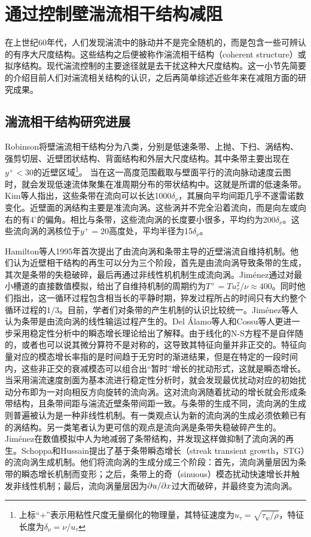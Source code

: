 \section{通过控制壁湍流相干结构减阻}
在上世纪60年代，人们发现湍流中的脉动并不是完全随机的，而是包含一些可辨认的有序大尺度结构。这些结构之后便被称作湍流相干结构（coherent structure）或拟序结构。现代湍流控制的主要途径就是去干扰这种大尺度结构。这一小节先简要的介绍目前人们对湍流相关结构的认识，之后再简单综述近些年来在减阻方面的研究成果。
\subsection{湍流相干结构研究进展}
Robinson\cite{Robinson1991}将壁湍流相干结构分为八类，分别是低速条带、上抛、下扫、涡结构、强剪切层、近壁团状结构、背面结构和外层大尺度结构。其中条带主要出现在$y^+<30$的近壁区域\footnote{上标“+”表示用粘性尺度无量纲化的物理量，其特征速度为$u_\tau=\sqrt{\tau_w/\rho}$，特征长度为$\delta_\nu=\nu/u_\tau$}。
当在这一高度范围截取与壁面平行的流向脉动速度云图时，就会发现低速流体聚集在准周期分布的带状结构中。这就是所谓的低速条带。Kim等人\cite{Kim1987}指出，这些条带在流向可以长达1000$\delta_\nu$，其展向平均间距几乎不遂雷诺数变化。近壁面的涡结构主要是准流向涡。这些涡并不完全沿着流向，而是向左或向右的有4$^\circ$的偏角\cite{Jeong1997}。相比与条带，这些流向涡的长度要小很多，平均约为200$\delta_\nu$。这些流向涡的涡核位于$y^+=20$高度处，平均半径为15$\delta_\nu$。

Hamilton等人\cite{Hamilton1995}1995年首次提出了由流向涡和条带主导的近壁湍流自维持机制。他们认为近壁相干结构的再生可以分为三个阶段，首先是由流向涡导致条带的生成，其次是条带的失稳破碎，最后再通过非线性机机制生成流向涡。Jim\'enez\cite{Jimenez2005}通过对最小槽道的直接数值模拟，给出了自维持机制的周期约为$T^+=Tu^2_\tau/\nu\approx400$。同时他们指出，这一循环过程包含相当长的平静时期，猝发过程所占的时间只有大约整个循环过程的1/3。目前，学者们对条带的产生机制的认识比较统一。Jim\'enez等人\cite{Jimenez1999}认为条带是由流向涡的线性输运过程产生的。Del \'Alamo等人\cite{del2006}和Cossu等人\cite{Cossu2009}更进一步采用稳定性分析中的瞬态增长理论给出了解释。由于线化的N-S方程不是自伴随的，或者也可以说其微分算符不是对称的，这导致其特征向量并非正交的。特征向量对应的模态增长率指的是时间趋于无穷时的渐进结果，但是在特定的一段时间内，这些非正交的衰减模态可以组合出“暂时”增长的扰动形式，这就是瞬态增长。当采用湍流速度剖面为基本流进行稳定性分析时，就会发现最优扰动对应的初始扰动分布即为一对向相反方向旋转的流向涡。这对流向涡随着扰动的增长就会形成条带结构，且条带间距与湍流近壁条带间距一致。与条带的生成不同，流向涡的生成则普遍被认为是一种非线性机制。有一类观点认为新的流向涡的生成必须依赖已有的涡结构\cite{Heist2000}。另一类笔者认为更可信的观点是流向涡是条带失稳破碎产生的。Jim\'enez\cite{Jimenez1999}在数值模拟中人为地减弱了条带结构，并发现这样做抑制了流向涡的再生。Schoppa和Hussain\cite{Schoppa2002}提出了基于条带瞬态增长（streak
transient growth，STG）的流向涡生成机制。他们将流向涡的生成分成三个阶段：首先，流向涡量层因为条带的瞬态增长机制而变形；之后，条带上的奇（sinuous）模态扰动快速增长并触发非线性机制；最后，流向涡量层因为$\partial u/\partial x$过大而破碎，并最终变为流向涡。


